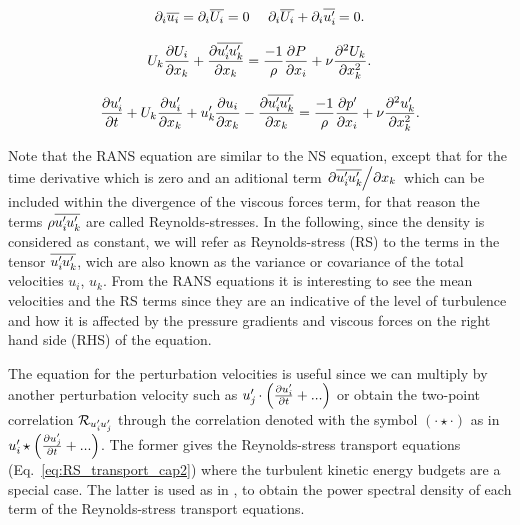 \begin{equation}
    \label{eq:cont_decomp}
    \partial_i \overline{u_i} = \partial_i \overline{U_i} = 0 ~~~~
    \partial_i \overline{U_i} + \partial_i \overline{u_i^{\prime}\mkern-1.2mu} = 0.  
\end{equation}

\begin{equation}
    \label{eq:RANS_cap2}
    U_k\pdv{U_i}{x_k} + \pdv{\overline{u_i^{\prime}\mkern-1.2muu_k^{\prime}\mkern-1.2mu}}{x_k} = \frac {-1} {\rho} \frac {\partial P}{\partial x_i} + \nu  \frac {\partial^2 U_k} {\partial x_k^2}.
\end{equation}

\begin{equation}
    \label{eq:pertub_cap2}
    {\pdv{u_i^{\prime}\mkern-1.2mu}{t} + 
    U_k\pdv{u_i^{\prime}\mkern-1.2mu}{x_k} + u_k^{\prime}\mkern-1.2mu\pdv{u_i}{x_k} - \pdv{\overline{u_i^{\prime}\mkern-1.2muu_k^{\prime}\mkern-1.2mu}}{x_k}  =
    \frac {-1} {\rho} \pdv{p^{\prime}\mkern-1.2mu}{x_i} + \nu  \frac {\partial^2 u_k^{\prime}\mkern-1.2mu} {\partial x_k^2}    }.
\end{equation}

Note that the RANS equation are similar to the NS equation, except that for the time derivative which is zero and an aditional term $\pdv{\overline{u_i^{\prime}\mkern-1.2muu_k^{\prime}\mkern-1.2mu}}/{x_k}$ which can be included within the divergence of the viscous forces term, for that reason the terms $\rho \overline{u_i^{\prime}\mkern-1.2mu u_k^{\prime}\mkern-1.2mu}$ are called Reynolds-stresses. In the following, since the density is considered as constant, we will refer as Reynolds-stress (RS) to the terms in the tensor $\overline{u_i^{\prime}\mkern-1.2mu u_k^{\prime}\mkern-1.2mu}$, wich are also known as the variance or covariance of the total velocities $u_i$, $u_k$.
From the RANS equations it is interesting to see the mean velocities and the RS terms since they are an indicative of the level of turbulence and how it is affected by the pressure gradients and viscous forces on the right hand side (RHS) of the equation.

The equation for the perturbation velocities is useful since we can multiply by another perturbation velocity such as $u_{j}^{\prime}\mkern-1.2mu \cdot \left( \pdv{u_{i}^{\prime}\mkern-1.2mu}{t} + ... \right) $ or obtain the two-point correlation $\mathcal{R}_{u_i^{\prime}\mkern-1.2mu u_j^{\prime}\mkern-1.2mu}$ through the correlation denoted with the symbol $(\cdot \star \cdot)$ as in $ u_{i}^{\prime}\mkern-1.2mu \star \left( \pdv{u_{j}^{\prime}\mkern-1.2mu}{t} + ... \right)$. The former gives the Reynolds-stress transport equations (Eq.~\ref{eq:RS_transport_cap2}) where the turbulent kinetic energy budgets are a special case. The latter is used as in \cite{lee_moser_2019}, to obtain the power spectral density of each term of the Reynolds-stress transport equations.

